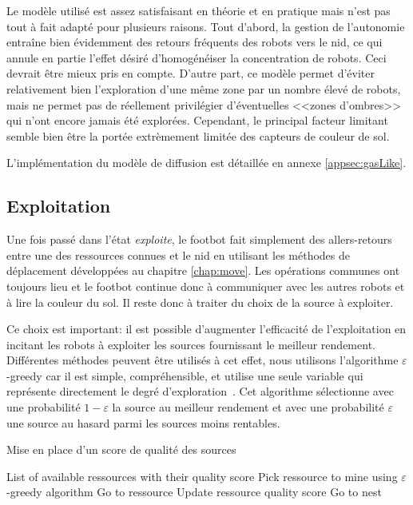 Le modèle utilisé est assez satisfaisant en théorie et en pratique mais n'est pas tout à fait adapté pour plusieurs raisons. Tout d'abord, la gestion de l'autonomie entraîne bien évidemment des retours fréquents des robots vers le nid, ce qui annule en partie l'effet désiré d'homogénéiser la concentration de robots. Ceci devrait être mieux pris en compte. D'autre part, ce modèle permet d'éviter relativement bien l'exploration d'une même zone par un nombre élevé de robots, mais ne permet pas de réellement privilégier d'éventuelles <<zones d'ombres>> qui n'ont encore jamais été explorées. Cependant, le principal facteur limitant semble bien être la portée extrèmement limitée des capteurs de couleur de sol.

L'implémentation du modèle de diffusion est détaillée en annexe \ref{appsec:gasLike}.

\subsection{Exploitation\label{sec:mine}}

Une fois passé dans l'état \emph{exploite}, le footbot fait simplement des allers-retours entre une des ressources connues et le nid en utilisant les méthodes de déplacement développées au chapitre \ref{chap:move}. Les opérations communes ont toujours lieu et le footbot continue donc à communiquer avec les autres robots et à lire la couleur du sol. Il reste donc à traiter du choix de la source à exploiter.

Ce choix est important: il est possible d'augmenter l'efficacité de l'exploitation en incitant les robots à exploiter les sources fournissant le meilleur rendement. Différentes méthodes peuvent être utilisés à cet effet, nous utilisons l'algorithme $\varepsilon$-greedy car il est simple, compréhensible, et utilise une seule variable qui représente directement le degré d'exploration~\cite{foraging}. Cet algorithme sélectionne avec une probabilité $1-\varepsilon$ la source au meilleur rendement et avec une probabilité $\varepsilon$ une source au hasard parmi les sources moins rentables.

\begin{algorithm}
\caption{Mise en place d'un score de qualité des sources}
\begin{algorithmic}
  \REQUIRE List of available ressources with their quality score
  \LOOP
    \STATE Pick ressource to mine using $\varepsilon$-greedy algorithm
    \STATE Go to ressource
    \STATE Update ressource quality score
    \STATE Go to nest
  \ENDLOOP
\end{algorithmic}
\end{algorithm}

